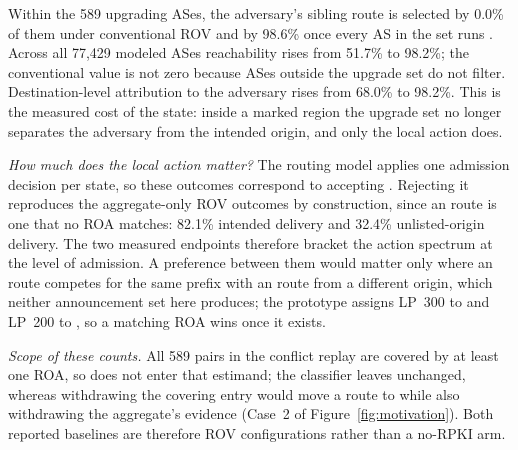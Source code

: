 {\revstart Within the 589 upgrading ASes, the adversary's sibling route is selected by 0.0\% of them under conventional ROV and by 98.6\% once every AS in the set runs \ssrov{}. Across all 77,429 modeled ASes reachability rises from 51.7\% to 98.2\%; the conventional value is not zero because ASes outside the upgrade set do not filter. Destination-level attribution to the adversary rises from 68.0\% to 98.2\%. This is the measured cost of the state: inside a marked region the upgrade set no longer separates the adversary from the intended origin, and only the local action does.}

{\revstart \emph{How much does the local action matter?} The routing model applies one admission decision per state, so these outcomes correspond to accepting \openscope{}. Rejecting it reproduces the aggregate-only ROV outcomes by construction, since an \openscope{} route is one that no ROA matches: 82.1\% intended delivery and 32.4\% unlisted-origin delivery. The two measured endpoints therefore bracket the action spectrum at the level of admission. A preference between them would matter only where an \openscope{} route competes for the same prefix with an \explicit{} route from a different origin, which neither announcement set here produces; the prototype assigns LP~300 to \explicit{} and LP~200 to \openscope{}, so a matching ROA wins once it exists.}

{\revstart \emph{Scope of these counts.} All 589 pairs in the conflict replay are covered by at least one ROA, so \notfound{} does not enter that estimand; the classifier leaves \notfound{} unchanged, whereas withdrawing the covering entry would move a route to \notfound{} while also withdrawing the aggregate's \explicit{} evidence (Case~2 of Figure~\ref{fig:motivation}). Both reported baselines are therefore ROV configurations rather than a no-RPKI arm.}
